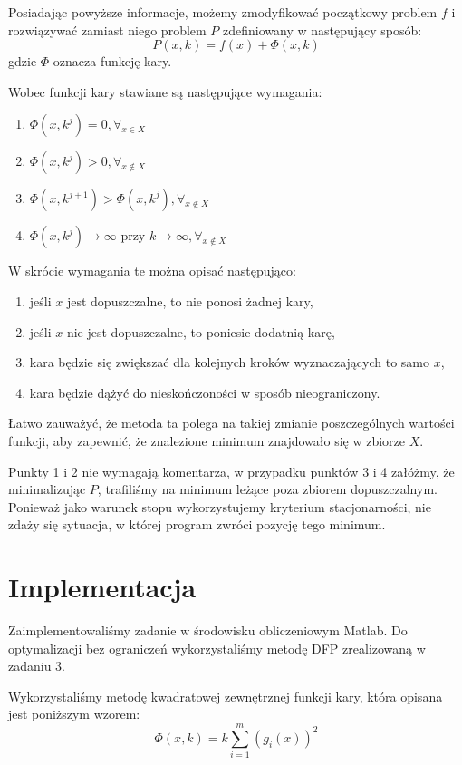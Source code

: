 \documentclass{classrep}
\begin{document}
Posiadając powyższe informacje, możemy zmodyfikować początkowy problem $f$ i rozwiązywać zamiast niego problem $P$ zdefiniowany w następujący sposób:
\begin{equation}
 P(x, k) = f(x) + \Phi(x, k)
\end{equation}
gdzie $\Phi$ oznacza funkcję kary.

Wobec funkcji kary stawiane są następujące wymagania:
\begin{enumerate}
 \item $\Phi(x, k^j) = 0, \displaystyle \forall_{x \in X}$
 \item $\Phi(x, k^j) > 0, \displaystyle \forall_{x \notin X}$
 \item $\Phi(x, k^{j + 1}) > \Phi(x, k^j), \displaystyle \forall_{x \notin X}$
 \item $\Phi(x, k^j) \rightarrow \infty \mbox{ przy } k \rightarrow \infty, \displaystyle \forall_{x \notin X}$
\end{enumerate}

W skrócie wymagania te można opisać następująco:
\begin{enumerate}
 \item jeśli $x$ jest dopuszczalne, to nie ponosi żadnej kary,
 \item jeśli $x$ nie jest dopuszczalne, to poniesie dodatnią karę,
 \item kara będzie się zwiększać dla kolejnych kroków wyznaczających to samo $x$,
 \item kara będzie dążyć do nieskończoności w sposób nieograniczony.
\end{enumerate}

Łatwo zauważyć, że metoda ta polega na takiej zmianie poszczególnych wartości funkcji, aby zapewnić, że znalezione minimum znajdowało się w zbiorze $X$.

Punkty 1 i 2 nie wymagają komentarza, w przypadku punktów 3 i 4 załóżmy, że minimalizując $P$, trafiliśmy na minimum leżące poza zbiorem dopuszczalnym. Ponieważ jako warunek stopu wykorzystujemy kryterium stacjonarności, nie zdaży się sytuacja, w której program zwróci pozycję tego minimum.

\section{Implementacja}
Zaimplementowaliśmy zadanie w środowisku obliczeniowym Matlab. Do optymalizacji bez ograniczeń wykorzystaliśmy metodę DFP zrealizowaną w zadaniu 3.

Wykorzystaliśmy metodę kwadratowej zewnętrznej funkcji kary, która opisana jest poniższym wzorem:
\begin{equation}
 \Phi(x, k) = k \displaystyle \sum^{m}_{i = 1} (g_i(x))^2
\end{equation}
\end{document}
